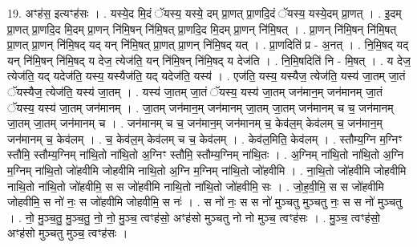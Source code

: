 \documentclass[17pt]{extarticle}
\begin{document}
19. अꣳह॑स॒ इत्यꣳह॑सः । . यस्ये॒द मि॒दं ॅयस्य॒ यस्ये॒ दम् प्रा॒णत् प्रा॒णदि॒दं ॅयस्य॒ यस्ये॒दम् प्रा॒णत् । . इ॒दम् प्रा॒णत् प्रा॒णदि॒द मि॒दम् प्रा॒णन् नि॑मि॒षन् नि॑मि॒षत् प्रा॒णदि॒द मि॒दम् प्रा॒णन् नि॑मि॒षत् । . प्रा॒णन् नि॑मि॒षन् नि॑मि॒षत् प्रा॒णत् प्रा॒णन् नि॑मि॒षद् यद् यन् नि॑मि॒षत् प्रा॒णत् प्रा॒णन् नि॑मि॒षद् यत् । . प्रा॒णदिति॑ प्र - अ॒नत् । . नि॒मि॒षद् यद् यन् नि॑मि॒षन् नि॑मि॒षद् य देज॒ त्येज॑ति॒ यन् नि॑मि॒षन् नि॑मि॒षद् य देज॑ति । . नि॒मि॒षदिति॑ नि - मि॒षत् । . य देज॒ त्येज॑ति॒ यद् यदेज॑ति॒ यस्य॒ यस्यैज॑ति॒ यद् यदेज॑ति॒ यस्य॑ । . एज॑ति॒ यस्य॒ यस्यैज॒ त्येज॑ति॒ यस्य॑ जा॒तम् जा॒तं ॅयस्यैज॒ त्येज॑ति॒ यस्य॑ जा॒तम् । . यस्य॑ जा॒तम् जा॒तं ॅयस्य॒ यस्य॑ जा॒तम् जन॑मान॒म् जन॑मानम् जा॒तं ॅयस्य॒ यस्य॑ जा॒तम् जन॑मानम् । . जा॒तम् जन॑मान॒म् जन॑मानम् जा॒तम् जा॒तम् जन॑मानम् च च॒ जन॑मानम् जा॒तम् जा॒तम् जन॑मानम् च । . जन॑मानम् च च॒ जन॑मान॒म् जन॑मानम् च॒ केव॑ल॒म् केव॑लम् च॒ जन॑मान॒म् जन॑मानम् च॒ केव॑लम् । . च॒ केव॑ल॒म् केव॑लम् च च॒ केव॑लम् । . केव॑ल॒मिति॒ केव॑लम् । . स्तौम्य॒ग्नि म॒ग्निꣳ स्तौमि॒ स्तौम्य॒ग्निम् ना॑थि॒तो ना॑थि॒तो अ॒ग्निꣳ स्तौमि॒ स्तौम्य॒ग्निम् ना॑थि॒तः । . अ॒ग्निम् ना॑थि॒तो ना॑थि॒तो अ॒ग्नि म॒ग्निम् ना॑थि॒तो जो॑हवीमि जोहवीमि नाथि॒तो अ॒ग्नि म॒ग्निम् ना॑थि॒तो जो॑हवीमि । . ना॒थि॒तो जो॑हवीमि जोहवीमि नाथि॒तो ना॑थि॒तो जो॑हवीमि॒ स स जो॑हवीमि नाथि॒तो ना॑थि॒तो जो॑हवीमि॒ सः । . जो॒ह॒वी॒मि॒ स स जो॑हवीमि जोहवीमि॒ स नो॑ नः॒ स जो॑हवीमि जोहवीमि॒ स नः॑ । . स नो॑ नः॒ स स नो॑ मुञ्चतु मुञ्चतु नः॒ स स नो॑ मुञ्चतु । . नो॒ मु॒ञ्च॒तु॒ मु॒ञ्च॒तु॒ नो॒ नो॒ मु॒ञ्च॒ त्वꣳह॑सो॒ अꣳह॑सो मुञ्चतु नो नो मुञ्च॒ त्वꣳह॑सः । . मु॒ञ्च॒ त्वꣳह॑सो॒ अꣳह॑सो मुञ्चतु मुञ्च॒ त्वꣳह॑सः । \newline
\end{document}

